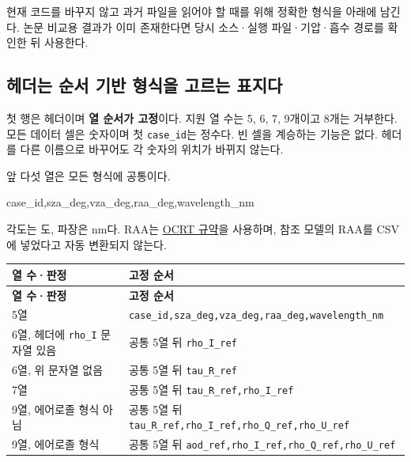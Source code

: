 현재 코드를 바꾸지 않고 과거 파일을 읽어야 할 때를 위해 정확한 형식을 아래에 남긴다. 논문 비교용 결과가 이미 존재한다면 당시 소스·실행 파일·기압·흡수 경로를 확인한 뒤 사용한다.

\subsection{헤더는 순서 기반 형식을 고르는 표지다}
\label{sec:auto:08_input_formats:3.2}
첫 행은 헤더이며 \textbf{열 순서가 고정}이다. 지원 열 수는 5, 6, 7, 9개이고 8개는 거부한다. 모든 데이터 셀은 숫자이며 첫 \texttt{case\_\allowbreak{}id}는 정수다. 빈 셀을 계승하는 기능은 없다. 헤더를 다른 이름으로 바꾸어도 각 숫자의 위치가 바뀌지 않는다.

앞 다섯 열은 모든 형식에 공통이다.


\begin{ManualCode}
case_id,sza_deg,vza_deg,raa_deg,wavelength_nm
\end{ManualCode}

각도는 도, 파장은 nm다. RAA는 \hyperref[chap:01_concepts_geometry]{OCRT 규약}을 사용하며, 참조 모델의 RAA를 CSV에 넣었다고 자동 변환되지 않는다.


{\TableFont
\begin{longtable}{@{}>{\raggedright\arraybackslash}p{}>{\raggedright\arraybackslash}p{}@{}}
\toprule
\textbf{열 수·판정} & \textbf{고정 순서} \\
\midrule
\endfirsthead
\toprule
\textbf{열 수·판정} & \textbf{고정 순서} \\
\midrule
\endhead
\bottomrule
\endfoot
5열 & \texttt{case\_\allowbreak{}id,\allowbreak{}sza\_\allowbreak{}deg,\allowbreak{}vza\_\allowbreak{}deg,\allowbreak{}raa\_\allowbreak{}deg,\allowbreak{}wavelength\_\allowbreak{}nm} \\
6열, 헤더에 \texttt{rho\_\allowbreak{}I} 문자열 있음 & 공통 5열 뒤 \texttt{rho\_\allowbreak{}I\_\allowbreak{}ref} \\
6열, 위 문자열 없음 & 공통 5열 뒤 \texttt{tau\_\allowbreak{}R\_\allowbreak{}ref} \\
7열 & 공통 5열 뒤 \texttt{tau\_\allowbreak{}R\_\allowbreak{}ref,\allowbreak{}rho\_\allowbreak{}I\_\allowbreak{}ref} \\
9열, 에어로졸 형식 아님 & 공통 5열 뒤 \texttt{tau\_\allowbreak{}R\_\allowbreak{}ref,\allowbreak{}rho\_\allowbreak{}I\_\allowbreak{}ref,\allowbreak{}rho\_\allowbreak{}Q\_\allowbreak{}ref,\allowbreak{}rho\_\allowbreak{}U\_\allowbreak{}ref} \\
9열, 에어로졸 형식 & 공통 5열 뒤 \texttt{aod\_\allowbreak{}ref,\allowbreak{}rho\_\allowbreak{}I\_\allowbreak{}ref,\allowbreak{}rho\_\allowbreak{}Q\_\allowbreak{}ref,\allowbreak{}rho\_\allowbreak{}U\_\allowbreak{}ref} \\
\end{longtable}
}

